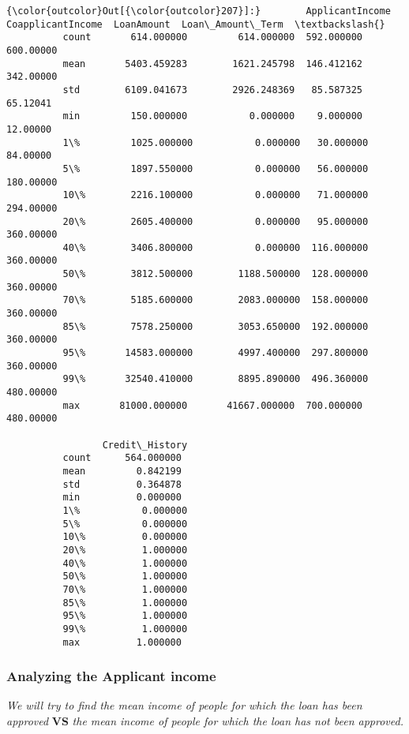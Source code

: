 \documentclass[11pt]{article}
\begin{document}
\begin{Verbatim}[commandchars=\\\{\}]
{\color{outcolor}Out[{\color{outcolor}207}]:}        ApplicantIncome  CoapplicantIncome  LoanAmount  Loan\_Amount\_Term  \textbackslash{}
          count       614.000000         614.000000  592.000000         600.00000   
          mean       5403.459283        1621.245798  146.412162         342.00000   
          std        6109.041673        2926.248369   85.587325          65.12041   
          min         150.000000           0.000000    9.000000          12.00000   
          1\%         1025.000000           0.000000   30.000000          84.00000   
          5\%         1897.550000           0.000000   56.000000         180.00000   
          10\%        2216.100000           0.000000   71.000000         294.00000   
          20\%        2605.400000           0.000000   95.000000         360.00000   
          40\%        3406.800000           0.000000  116.000000         360.00000   
          50\%        3812.500000        1188.500000  128.000000         360.00000   
          70\%        5185.600000        2083.000000  158.000000         360.00000   
          85\%        7578.250000        3053.650000  192.000000         360.00000   
          95\%       14583.000000        4997.400000  297.800000         360.00000   
          99\%       32540.410000        8895.890000  496.360000         480.00000   
          max       81000.000000       41667.000000  700.000000         480.00000   
          
                 Credit\_History  
          count      564.000000  
          mean         0.842199  
          std          0.364878  
          min          0.000000  
          1\%           0.000000  
          5\%           0.000000  
          10\%          0.000000  
          20\%          1.000000  
          40\%          1.000000  
          50\%          1.000000  
          70\%          1.000000  
          85\%          1.000000  
          95\%          1.000000  
          99\%          1.000000  
          max          1.000000  
\end{Verbatim}
            
    \subsubsection{Analyzing the Applicant
income}\label{analyzing-the-applicant-income}

\emph{We will try to find the mean income of people for which the loan
has been approved} \textbf{VS} \emph{the mean income of people for which
the loan has not been approved.}
\end{document}
